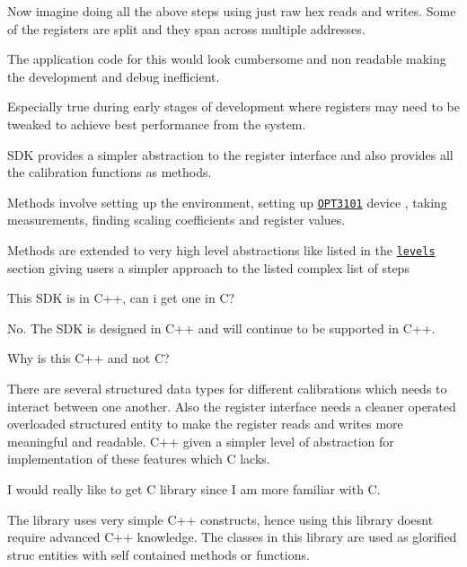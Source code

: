 \begin{DoxyEnumerate}
\begin{DoxyItemize}
\begin{DoxyItemize}
\end{DoxyItemize}
\item Now imagine doing all the above steps using just raw hex reads and writes. Some of the registers are split and they span across multiple addresses.
\item The application code for this would look cumbersome and non readable making the development and debug inefficient.
\item Especially true during early stages of development where registers may need to be tweaked to achieve best performance from the system.
\item S\+DK provides a simpler abstraction to the register interface and also provides all the calibration functions as methods.
\item Methods involve setting up the environment, setting up \href{http://www.ti.com/product/OPT3101}{\tt O\+P\+T3101} device , taking measurements, finding scaling coefficients and register values.
\item Methods are extended to very high level abstractions like listed in the \href{#Levels}{\tt levels} section giving users a simpler approach to the listed complex list of steps
\end{DoxyItemize}
\item This S\+DK is in C++, can i get one in C?
\begin{DoxyItemize}
\item No. The S\+DK is designed in C++ and will continue to be supported in C++.
\end{DoxyItemize}
\item Why is this C++ and not C?
\begin{DoxyItemize}
\item There are several structured data types for different calibrations which needs to interact between one another. Also the register interface needs a cleaner operated overloaded structured entity to make the register reads and writes more meaningful and readable. C++ given a simpler level of abstraction for implementation of these features which C lacks.
\end{DoxyItemize}
\item I would really like to get C library since I am more familiar with C.
\begin{DoxyItemize}
\item The library uses very simple C++ constructs, hence using this library doesn\textquotesingle{}t require advanced C++ knowledge. The classes in this library are used as glorified struc entities with self contained methods or functions.

\end{DoxyItemize}
\end{DoxyEnumerate}

